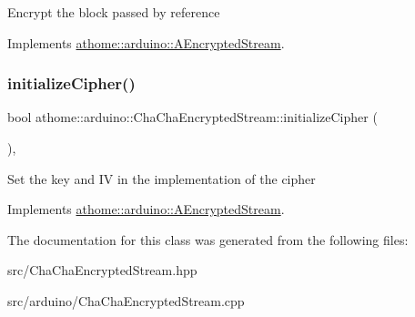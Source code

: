 Encrypt the block passed by reference 

Implements \mbox{\hyperlink{classathome_1_1arduino_1_1_a_encrypted_stream_a823ec054953b2f239a4bdbbc691ed984}{athome\+::arduino\+::\+A\+Encrypted\+Stream}}.

\mbox{\label{classathome_1_1arduino_1_1_cha_cha_encrypted_stream_adc55767997450f10d99a6e907a9c95ff}} 
\subsubsection{\texorpdfstring{initialize\+Cipher()}{initializeCipher()}}
{\footnotesize\ttfamily bool athome\+::arduino\+::\+Cha\+Cha\+Encrypted\+Stream\+::initialize\+Cipher (\begin{DoxyParamCaption}\item[{const \mbox{\hyperlink{classathome_1_1arduino_1_1_a_encrypted_stream_a67d68ce9b0daa19296b38c9bb3a5aee7}{Cipher\+Materials}} \&}]{ }\end{DoxyParamCaption})\hspace{0.3cm}{\ttfamily [protected]}, {\ttfamily [virtual]}}

Set the key and IV in the implementation of the cipher 

Implements \mbox{\hyperlink{classathome_1_1arduino_1_1_a_encrypted_stream_a7b167d800f8ccb734228ed8e5b09d553}{athome\+::arduino\+::\+A\+Encrypted\+Stream}}.



The documentation for this class was generated from the following files\+:\begin{DoxyCompactItemize}
\item 
src/Cha\+Cha\+Encrypted\+Stream.\+hpp\item 
src/arduino/Cha\+Cha\+Encrypted\+Stream.\+cpp\end{DoxyCompactItemize}
